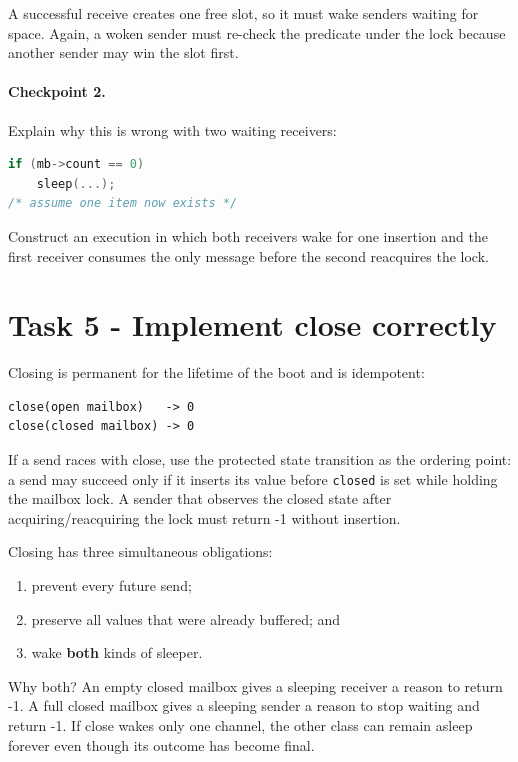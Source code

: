 \documentclass[11pt,a4paper]{article}
\newcommand{\file}[1]{\texttt{#1}}
\begin{document}
A successful receive creates one free slot, so it must wake senders waiting for space. Again, a woken sender must re-check the predicate under the lock because another sender may win the slot first.

\paragraph{Checkpoint 2.} Explain why this is wrong with two waiting receivers:

\begin{lstlisting}[language=C]
if (mb->count == 0)
    sleep(...);
/* assume one item now exists */
\end{lstlisting}

Construct an execution in which both receivers wake for one insertion and the first receiver consumes the only message before the second reacquires the lock.

\section{Task 5 - Implement close correctly}

Closing is permanent for the lifetime of the boot and is idempotent:

\begin{lstlisting}
close(open mailbox)   -> 0
close(closed mailbox) -> 0
\end{lstlisting}

If a send races with close, use the protected state transition as the ordering point: a send may succeed only if it inserts its value before \file{closed} is set while holding the mailbox lock. A sender that observes the closed state after acquiring/reacquiring the lock must return -1 without insertion.

Closing has three simultaneous obligations:

\begin{enumerate}[leftmargin=7mm]
\item prevent every future send;
\item preserve all values that were already buffered; and
\item wake \textbf{both} kinds of sleeper.
\end{enumerate}

Why both? An empty closed mailbox gives a sleeping receiver a reason to return -1. A full closed mailbox gives a sleeping sender a reason to stop waiting and return -1. If close wakes only one channel, the other class can remain asleep forever even though its outcome has become final.
\end{document}

